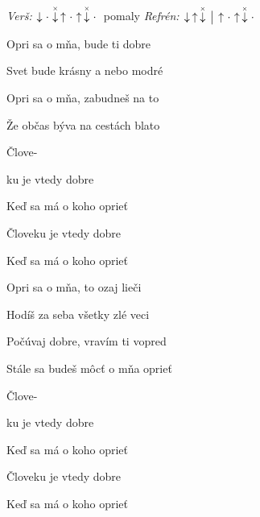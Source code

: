 \begin{song}


\begin{headerbox}
\RaiseBoxWithAccents
\textit{Verš:} $\Down\Miss\ChuckDown\Up\Miss\Up\ChuckDown\Miss$ pomaly \quad
\textit{Refrén:} $\Down\Up\ChuckDown \Separator \Up\Miss\Up\ChuckDown\Miss$
\end{headerbox}

\begin{hchordbox}
\end{hchordbox}

\Large

\bigskip

 Opri sa o mňa,  bude ti dobre \par
{} Svet bude krásny  a nebo modré \par
{} Opri sa o mňa,  zabudneš na to \par
{} Že občas býva na cestách blato \par

\bigskip

 Člove- \par
{}ku je vtedy dobre   \par
Keď sa má o koho oprieť  \par
Človeku je vtedy dobre   \par
Keď sa má o koho oprieť  \par

\bigskip

 Opri sa o mňa,  to ozaj lieči \par
{} Hodíš za seba všetky zlé veci \par
{} Počúvaj dobre,  vravím ti vopred \par
{} Stále sa budeš môcť o mňa oprieť \par

\bigskip

 Člove- \par
{}ku je vtedy dobre   \par
Keď sa má o koho oprieť  \par
Človeku je vtedy dobre   \par
Keď sa má o koho oprieť  \par


\end{song}
